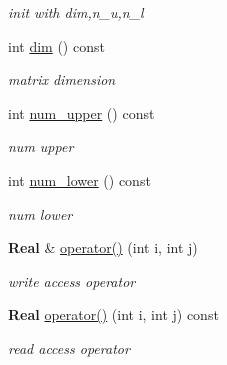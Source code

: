 \begin{DoxyCompactItemize}
\begin{DoxyCompactList}\small\item\em init with dim,n\+\_\+u,n\+\_\+l \end{DoxyCompactList}\item 
\mbox{\label{classband__matrix_ad8ef88cdb013c85d2e90c117c7e16981}} 
int \hyperlink{classband__matrix_ad8ef88cdb013c85d2e90c117c7e16981}{dim} () const
\begin{DoxyCompactList}\small\item\em matrix dimension \end{DoxyCompactList}\item 
\mbox{\label{classband__matrix_afe1552086e9f956abfd7b8437d847e69}} 
int \hyperlink{classband__matrix_afe1552086e9f956abfd7b8437d847e69}{num\+\_\+upper} () const
\begin{DoxyCompactList}\small\item\em num upper \end{DoxyCompactList}\item 
\mbox{\label{classband__matrix_a0c99d328b362f825e8dd8ff07e84305f}} 
int \hyperlink{classband__matrix_a0c99d328b362f825e8dd8ff07e84305f}{num\+\_\+lower} () const
\begin{DoxyCompactList}\small\item\em num lower \end{DoxyCompactList}\item 
\mbox{\label{classband__matrix_aaec1dcb90de7879c78e9abd99fe1c975}} 
\textbf{ Real} \& \hyperlink{classband__matrix_aaec1dcb90de7879c78e9abd99fe1c975}{operator()} (int i, int j)
\begin{DoxyCompactList}\small\item\em write access operator \end{DoxyCompactList}\item 
\mbox{\label{classband__matrix_a1c5ce22028e645b75ebc4d62337c1f47}} 
\textbf{ Real} \hyperlink{classband__matrix_a1c5ce22028e645b75ebc4d62337c1f47}{operator()} (int i, int j) const
\begin{DoxyCompactList}\small\item\em read access operator \end{DoxyCompactList}\item 

\end{DoxyCompactItemize}
